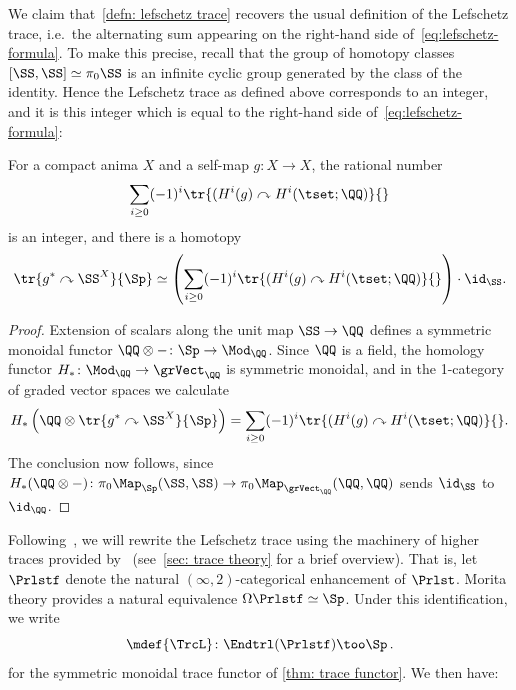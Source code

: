We claim that~\cref{defn: lefschetz trace} recovers the usual definition of the Lefschetz trace, i.e.~the alternating sum appearing on the right-hand side of~\eqref{eq:lefschetz-formula}. To make this precise, recall that the group of homotopy classes $\lbrack\SS ,\SS\rbrack\simeq\pi_0\SS$ is an infinite cyclic group generated by the class of the identity. Hence the Lefschetz trace as defined above corresponds to an integer, and it is this integer which is equal to the right-hand side of~\eqref{eq:lefschetz-formula}:
\begin{prop}
  For a compact anima $X$ and a self-map $g\colon X\to X$, the rational number
  \[
    \sum_{i\geq 0}(-1)^{i} \tr{(H^{i}(g)\curvearrowright H^{i}(\tset;\QQ )}{}
  \]
  is an integer, and there is a homotopy
  \begin{equation}
    \label{eq:trace-hurewicz}
    \tr{g^*\curvearrowright\SS^X}{\Sp} \simeq
    \left(\sum_{i\geq 0}(-1)^{i} \tr{(H^{i}(g)\curvearrowright H^{i}(\tset;\QQ )}{}\right)\cdot \id_\SS.
  \end{equation}
\end{prop}
\begin{proof}
  Extension of scalars along the unit map $\SS\to\QQ$ defines a symmetric monoidal functor $\QQ\otimes {-}\colon\Sp\to\Mod_{\QQ}$. Since $\QQ$ is a field, the homology functor $H_*\colon\Mod_{\QQ}\to\grVect_{\QQ}$ is symmetric monoidal, and in the 1-category of graded vector spaces we calculate
  \[
    H_*\left( \QQ\otimes\tr{g^*\curvearrowright\SS^X}{\Sp}\right) = \sum_{i\geq 0}(-1)^{i} \tr{(H^{i}(g)\curvearrowright H^{i}(\tset;\QQ )}{}.
  \]
  The conclusion now follows, since $H_*(\QQ\otimes{-})\colon\pi_0\Map_{\Sp}(\SS ,\SS )\to\pi_0\Map_{\grVect_{\QQ}}(\QQ ,\QQ )$ sends $\id_\SS$ to $\id_\QQ$.
\end{proof}

Following~\cite{Kondyrev_Prikhodko2020}, we will rewrite the Lefschetz trace using the machinery of higher traces provided by~\cite{Hoyois_Scherotzke_Sibilla2017} (see~\cref{sec: trace theory} for a brief overview). That is, let $\Prlstf$ denote the natural $(\infty,2)$-categorical enhancement of $\Prlst$. Morita theory provides a natural equivalence $\Omega \Prlstf \simeq \Sp$. Under this identification, we write
\[
  \mdef{\TrcL}\colon \Endtrl(\Prlstf)\too \Sp\,.
\]
for the symmetric monoidal trace functor of \cref{thm: trace functor}. We then have:

